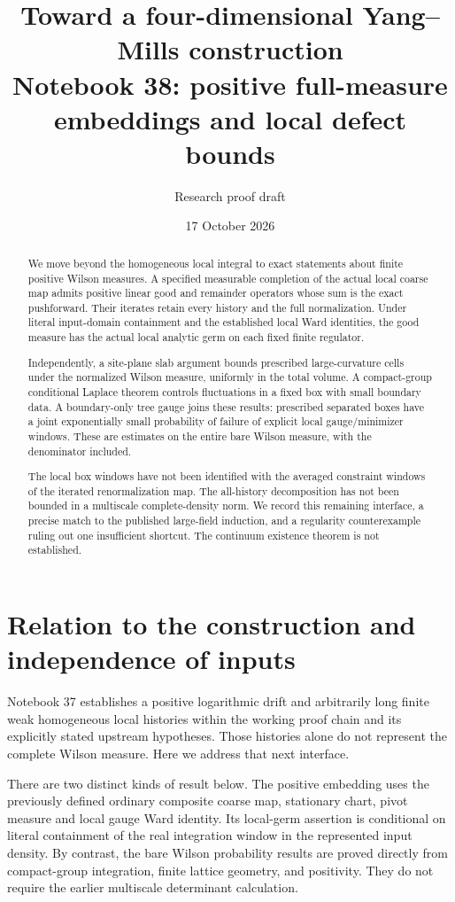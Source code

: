 \documentclass[11pt]{article}
\title{Toward a four-dimensional Yang--Mills construction\\
\large Notebook 38: positive full-measure embeddings and local defect bounds}
\author{Research proof draft}
\date{17 October 2026}
\theoremstyle{remark}
\begin{document}
\maketitle
\begin{abstract}
We move beyond the homogeneous local integral to exact statements
about finite positive Wilson measures. A specified measurable
completion of the actual local coarse map admits positive linear
good and remainder operators whose sum is the exact pushforward.
Their iterates retain every history and the full normalization.
Under literal input-domain containment and the established local
Ward identities, the good measure has the actual local analytic
germ on each fixed finite regulator.

Independently, a site-plane slab argument bounds prescribed
large-curvature cells under the normalized Wilson measure, uniformly
in the total volume. A compact-group conditional Laplace theorem
controls fluctuations in a fixed box with small boundary data.
A boundary-only tree gauge joins these results: prescribed
separated boxes have a joint exponentially small probability of
failure of explicit local gauge/minimizer windows. These are
estimates on the entire bare Wilson measure, with the denominator
included.

The local box windows have not been identified with the averaged
constraint windows of the iterated renormalization map. The
all-history decomposition has not been bounded in a multiscale
complete-density norm. We record this remaining interface, a
precise match to the published large-field induction, and a
regularity counterexample ruling out one insufficient shortcut.
The continuum existence theorem is not established.
\end{abstract}

\section*{Relation to the construction and independence of inputs}

Notebook 37 establishes a positive logarithmic drift and arbitrarily
long finite weak homogeneous local histories within the working
proof chain and its explicitly stated upstream hypotheses. Those
histories alone do not represent the complete Wilson measure.
Here we address that next interface.

There are two distinct kinds of result below. The positive
embedding uses the previously defined ordinary composite coarse
map, stationary chart, pivot measure and local gauge Ward identity.
Its local-germ assertion is conditional on literal containment of
the real integration window in the represented input density.
By contrast, the bare Wilson probability results are proved
directly from compact-group integration, finite lattice geometry,
and positivity. They do not require the earlier multiscale
determinant calculation.
\end{document}
